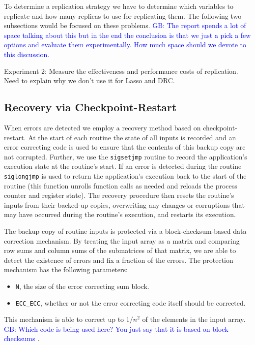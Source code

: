 \documentclass{sig-alternate}
\newcommand{\greg}[1]{%
  \textcolor{blue}{GB: #1}
}
\begin{document}
To determine a replication strategy we have to determine which variables to replicate and how many replicas to use for replicating them. The following two subsections would be focused on these problems.
\greg{The report spends a lot of space talking about this but in the end the conclusion is that we just a pick a few options and evaluate them experimentally. How much space should we devote to this discussion.}

Experiment 2: Measure the effectiveness and performance costs of replication. Need to explain why we don't use it for Lasso and DRC.

\subsection{Recovery via Checkpoint-Restart}
\label{sec:res_tech:cr}

When errors are detected we employ a recovery method based on checkpoint-restart.
At the start of each routine the state of all inputs is recorded and an error correcting code is used to ensure that the contents of this backup copy are not corrupted.
Further, we use the \texttt{sigsetjmp} routine to record the application's execution state at the routine's start.
If an error is detected during the routine \texttt{siglongjmp} is used to return the application's execution back to the start of the routine (this function unrolls function calls as needed and reloads the process counter and register state).
The recovery procedure then resets the routine's inputs from their backed-up copies, overwriting any changes or corruptions that may have occurred during the routine's execution, and restarts its execution.

The backup copy of routine inputs is protected via a block-checksum-based data correction mechanism.
By treating the input array as a matrix and comparing row sums and column sums of the submatrices of that matrix, we are able to detect the existence of errors and fix a fraction of the errors.
The protection mechanism has the following parameters:
\begin{itemize}
\item{\texttt{N}, the size of the error correcting sum block.}
\item{\texttt{ECC\_ECC}, whether or not the error correcting code itself should be corrected.}
\end{itemize}
This mechanism is able to correct up to $1/{n^2}$ of the elements in the input array.
\greg{Which code is being used here? You just say that it is based on block-checksums}.
\end{document}
